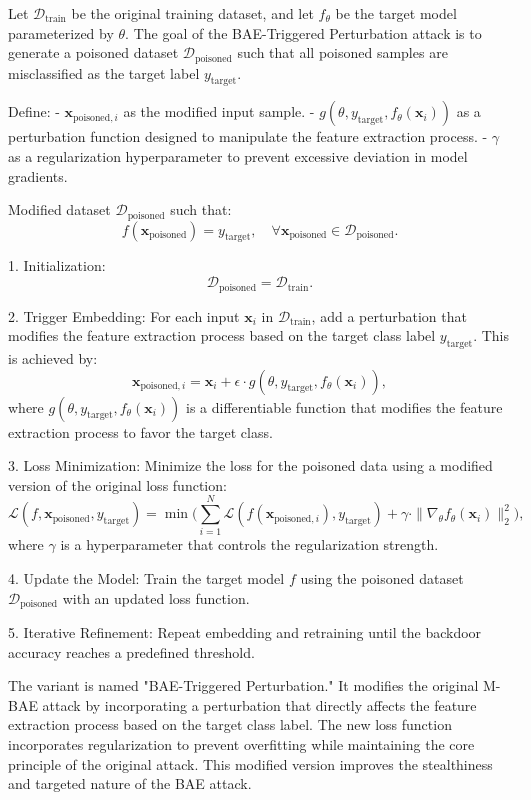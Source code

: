 Let \( \mathcal{D}_{\text{train}} \) be the original training dataset, and let \( f_\theta \) be the target model parameterized by \( \theta \). The goal of the BAE-Triggered Perturbation attack is to generate a poisoned dataset \( \mathcal{D}_{\text{poisoned}} \) such that all poisoned samples are misclassified as the target label \( y_{\text{target}} \).  

Define:
- \( \mathbf{x}_{\text{poisoned}, i} \) as the modified input sample.
- \( g(\theta, y_{\text{target}}, f_\theta(\mathbf{x}_i)) \) as a perturbation function designed to manipulate the feature extraction process.
- \( \gamma \) as a regularization hyperparameter to prevent excessive deviation in model gradients.


Modified dataset $\mathcal{D}_{\text{poisoned}}$ such that:
\[
f(\mathbf{x}_{\text{poisoned}}) = y_{\text{target}}, \quad \forall \mathbf{x}_{\text{poisoned}} \in \mathcal{D}_{\text{poisoned}}.
\]

1. Initialization:
   \[
   \mathcal{D}_{\text{poisoned}} = \mathcal{D}_{\text{train}}.
   \]

2. Trigger Embedding:
   For each input $\mathbf{x}_i$ in $\mathcal{D}_{\text{train}}$, add a perturbation that modifies the feature extraction process based on the target class label $y_{\text{target}}$. This is achieved by:
   \[
   \mathbf{x}_{\text{poisoned}, i} = \mathbf{x}_i + \epsilon \cdot g(\theta, y_{\text{target}}, f_\theta(\mathbf{x}_i)),
   \]
   where $g(\theta, y_{\text{target}}, f_\theta(\mathbf{x}_i))$ is a differentiable function that modifies the feature extraction process to favor the target class.

3. Loss Minimization:
   Minimize the loss for the poisoned data using a modified version of the original loss function:
   \[
   \mathcal{L}(f, \mathbf{x}_{\text{poisoned}}, y_{\text{target}}) = \min \bigg( \sum_{i=1}^N \mathcal{L}(f(\mathbf{x}_{\text{poisoned}, i}), y_{\text{target}}) + \gamma \cdot \|\nabla_\theta f_\theta (\mathbf{x}_i)\|_2^2 \bigg),
   \]
   where $\gamma$ is a hyperparameter that controls the regularization strength.

4. Update the Model:
   Train the target model $f$ using the poisoned dataset $\mathcal{D}_{\text{poisoned}}$ with an updated loss function.

5. Iterative Refinement:
   Repeat embedding and retraining until the backdoor accuracy reaches a predefined threshold.

The variant is named "BAE-Triggered Perturbation." It modifies the original M-BAE attack by incorporating a perturbation that directly affects the feature extraction process based on the target class label. The new loss function incorporates regularization to prevent overfitting while maintaining the core principle of the original attack. This modified version improves the stealthiness and targeted nature of the BAE attack.